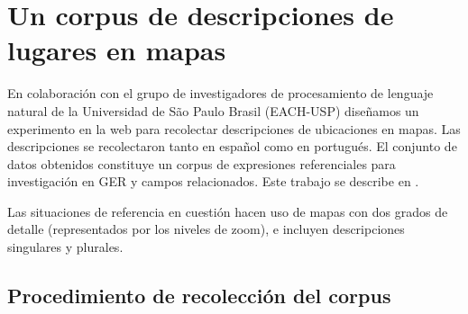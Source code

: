 \section{Un corpus de descripciones de lugares en mapas}


En colaboraci\'on con el grupo de investigadores de procesamiento de lenguaje natural de la Universidad de S\~ao Paulo Brasil (EACH-USP) dise\~namos un experimento en la web para recolectar descripciones de ubicaciones en mapas. Las descripciones se recolectaron tanto en espa\~nol como en portugu\'es. El conjunto de datos obtenidos constituye un corpus de expresiones referenciales para investigaci\'on en GER y campos relacionados. Este trabajo se describe en \cite{DBLP:conf/acl/AltamiranoFPB15}.

Las situaciones de referencia en cuesti\'on hacen uso de mapas con dos grados de detalle (representados por los niveles de zoom), e incluyen descripciones singulares y plurales.



\subsection{Procedimiento de recolecci\'on del corpus}
\label{corpus-voluntarios}

